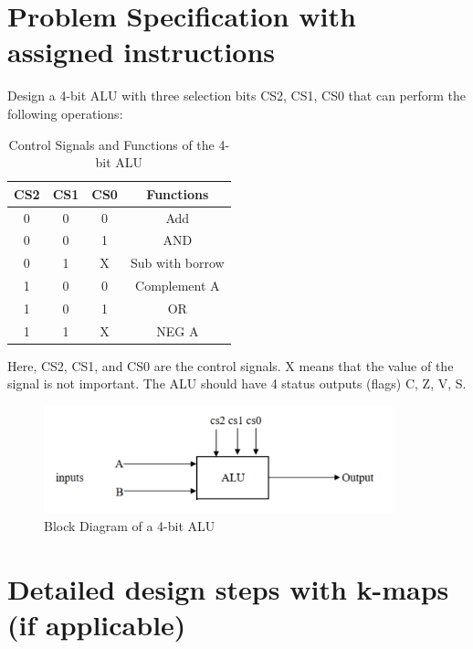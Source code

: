 \documentclass[11pt]{article}
\begin{document}
\section{Problem Specification with assigned instructions}
Design a 4-bit ALU with three selection bits CS2, CS1, CS0 that can perform the following operations:
\begin{table}[ht]
    \centering
    \begin{tabular}{|c|c|c|c|}
        \hline
        \textbf{CS2} & \textbf{CS1} & \textbf{CS0} & \textbf{Functions} \\
        \hline
        0 & 0 & 0 & Add \\
        \hline
        0 & 0 & 1 & AND \\
        \hline
        0 & 1 & X & Sub with borrow \\
        \hline
        1 & 0 & 0 & Complement A \\
        \hline
        1 & 0 & 1 & OR \\
        \hline
        1 & 1 & X & NEG A \\
        \hline
    \end{tabular}
    \caption{Control Signals and Functions of the 4-bit ALU}
\end{table}

Here, CS2, CS1, and CS0 are the control signals. X means that the value of the signal is not important. The ALU should have 4 status outputs (flags) C, Z, V, S.
\begin{figure}[ht]
    \centering
    \includegraphics[width=0.9\textwidth]{images/ALU2.png}
    \caption{Block Diagram of a 4-bit ALU}
\end{figure}

\section{Detailed design steps with k-maps (if applicable)}
\end{document}
